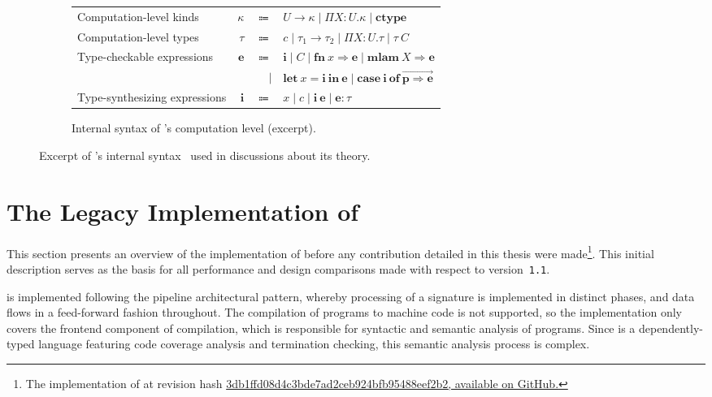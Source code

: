 \begin{figure}
\begin{subfigure}{\linewidth}
\begin{tabular}{lrrl}
Computation-level kinds & $\kappa$ & $\Coloneqq$ & $U \to \kappa \mid \Pi X{:}U. \kappa \mid \mathbf{ctype}$\\
Computation-level types & $\tau$ & $\Coloneqq$ & $c \mid \tau_1 \to \tau_2 \mid \Pi X{:}U. \tau \mid \tau\ C$\\
Type-checkable expressions & $\mathbf{e}$ & $\Coloneqq$ & $\mathbf{i} \mid C \mid \mathbf{fn}\ x \Rightarrow \mathbf{e} \mid \mathbf{mlam}\ X \Rightarrow \mathbf{e}$ \\
& & $|$ & $\mathbf{let}\ x = \mathbf{i}\ \mathbf{in}\ \mathbf{e} \mid \mathbf{case}\ \mathbf{i}\ \mathbf{of}\ \overrightarrow{\mathbf{p} \Rightarrow \mathbf{e}}$\\
Type-synthesizing expressions & $\mathbf{i}$ & $\Coloneqq$ & $x \mid c \mid \mathbf{i} \ \mathbf{e} \mid \mathbf{e} : \tau$
\end{tabular}
\caption{Internal syntax of \Beluga's computation level (excerpt).}
\end{subfigure}
\caption[Excerpt of \Beluga's internal syntax.]{%
Excerpt of \Beluga's internal syntax~\cite{nanevski2008contextual, germain2010implementation, cave2013first, ferreira2013compiling} used in discussions about its theory.
}
\label{figure:internal-syntax}
\end{figure}

\section{The Legacy Implementation of \Beluga} \label{section:beluga-implementation}

This section presents an overview of the implementation of \Beluga before any contribution detailed in this thesis were made\footnote{The implementation of \Beluga at revision hash \href{https://github.com/Beluga-lang/Beluga/tree/3db1ffd08d4c3bde7ad2ceb924bfb95488eef2b2}{3db1ffd08d4c3bde7ad2ceb924bfb95488eef2b2, available on GitHub.}}.
This initial description serves as the basis for all performance and design comparisons made with respect to \Beluga version~\texttt{1.1}.

\Beluga is implemented following the pipeline architectural pattern, whereby processing of a \Beluga signature is implemented in distinct phases, and data flows in a feed-forward fashion throughout.
The compilation of \Beluga programs to machine code is not supported, so the implementation only covers the frontend component of compilation, which is responsible for syntactic and semantic analysis of programs.
Since \Beluga is a dependently-typed language featuring code coverage analysis and termination checking, this semantic analysis process is complex.

